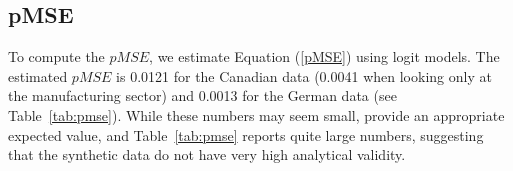 





\subsection{pMSE}



To compute the $pMSE$, we estimate Equation (\ref{pMSE}) using logit models. The estimated $pMSE$ is 0.0121 for the Canadian data (0.0041 when looking only at the manufacturing sector) and 0.0013 for the German data (see Table~\ref{tab:pmse}). While these numbers may seem small, \citet{Snoke_RSSA2018} provide an appropriate expected value, and Table~\ref{tab:pmse} reports quite large numbers, suggesting that the synthetic data do not have very high analytical validity.


